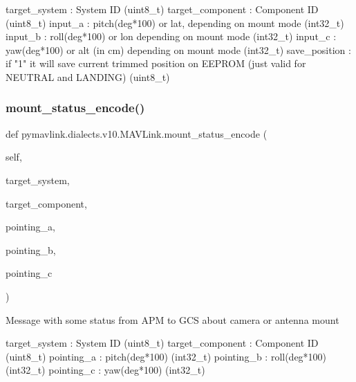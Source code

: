 \begin{DoxyVerb}
\begin{DoxyVerb}
\begin{DoxyVerb}
\begin{DoxyVerb}
\begin{DoxyVerb}
target_system             : System ID (uint8_t)
target_component          : Component ID (uint8_t)
input_a                   : pitch(deg*100) or lat, depending on mount mode (int32_t)
input_b                   : roll(deg*100) or lon depending on mount mode (int32_t)
input_c                   : yaw(deg*100) or alt (in cm) depending on mount mode (int32_t)
save_position             : if "1" it will save current trimmed position on EEPROM (just valid for NEUTRAL and LANDING) (uint8_t)\end{DoxyVerb}
 \mbox{\label{classpymavlink_1_1dialects_1_1v10_1_1MAVLink_ab4ef36731c418f097c65cd3e3c35ee04}} 
\subsubsection{\texorpdfstring{mount\+\_\+status\+\_\+encode()}{mount\_status\_encode()}}
{\footnotesize\ttfamily def pymavlink.\+dialects.\+v10.\+M\+A\+V\+Link.\+mount\+\_\+status\+\_\+encode (\begin{DoxyParamCaption}\item[{}]{self,  }\item[{}]{target\+\_\+system,  }\item[{}]{target\+\_\+component,  }\item[{}]{pointing\+\_\+a,  }\item[{}]{pointing\+\_\+b,  }\item[{}]{pointing\+\_\+c }\end{DoxyParamCaption})}

\begin{DoxyVerb}Message with some status from APM to GCS about camera or antenna mount

target_system             : System ID (uint8_t)
target_component          : Component ID (uint8_t)
pointing_a                : pitch(deg*100) (int32_t)
pointing_b                : roll(deg*100) (int32_t)
pointing_c                : yaw(deg*100) (int32_t)\end{DoxyVerb}
 \mbox{\label{classpymavlink_1_1dialects_1_1v10_1_1MAVLink_a3e02d8c1253680a64f754be170ea8753}} 

\end{DoxyVerb}
\end{DoxyVerb}
\end{DoxyVerb}
\end{DoxyVerb}
